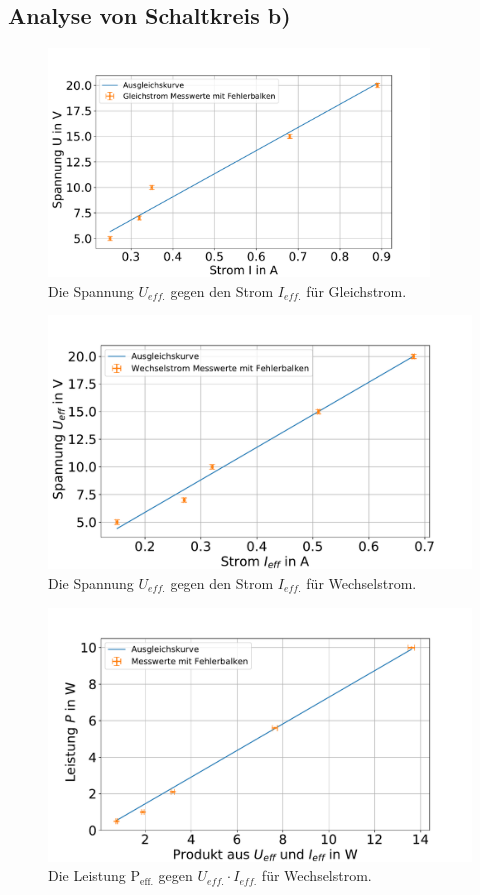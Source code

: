\subsection{Analyse von Schaltkreis b)}\label{kap:Spule}
\begin{figure}[h]
	\centering
	\includegraphics[width=0.9\textwidth]{res/UgegenI_GL.pdf}
	\caption{Die Spannung $U_{eff.}$ gegen den Strom $I_{eff.}$ für Gleichstrom.}
	\label{fig:UgegenIgl}
\end{figure}
\begin{figure}[h]
	\centering
	\includegraphics[width=0.9\linewidth]{res/UgegenI_W.pdf}
	\caption{Die Spannung $U_{eff.}$ gegen den Strom $I_{eff.}$ für Wechselstrom.}
	\label{fig:UgegenIw}
\end{figure}
\begin{figure}[h]
	\centering
	\includegraphics[width=0.9\linewidth]{res/PgegenUI.pdf}
	\caption{Die Leistung P$_\text{eff.}$ gegen $U_{eff.} \cdot I_{eff.}$ für Wechselstrom.}
	\label{fig:PgegenUI}
\end{figure}
